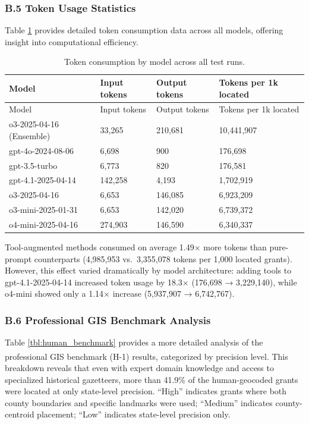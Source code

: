 \documentclass[
  10pt,
  twocolumn]{article}
\begin{document}
\subsubsection{B.5 Token Usage
Statistics}\label{b.5-token-usage-statistics}

Table \ref{tbl:token_usage} provides detailed token consumption data
across all models, offering insight into computational efficiency.

\begin{longtable}[]{@{}llll@{}}
\caption{\label{tbl:token_usage}Token consumption by model across all
test runs.}\tabularnewline
\toprule\noalign{}
Model & Input tokens & Output tokens & Tokens per 1k located \\
\midrule\noalign{}
\endfirsthead
\toprule\noalign{}
Model & Input tokens & Output tokens & Tokens per 1k located \\
\midrule\noalign{}
\endhead
\bottomrule\noalign{}
\endlastfoot
o3-2025-04-16 (Ensemble) & 33,265 & 210,681 & 10,441,907 \\
gpt-4o-2024-08-06 & 6,698 & 900 & 176,698 \\
gpt-3.5-turbo & 6,773 & 820 & 176,581 \\
gpt-4.1-2025-04-14 & 142,258 & 4,193 & 1,702,919 \\
o3-2025-04-16 & 6,653 & 146,085 & 6,923,209 \\
o3-mini-2025-01-31 & 6,653 & 142,020 & 6,739,372 \\
o4-mini-2025-04-16 & 274,903 & 146,590 & 6,340,337 \\
\end{longtable}

Tool-augmented methods consumed on average 1.49× more tokens than
pure-prompt counterparts (4,985,953 vs.~3,355,078 tokens per 1,000
located grants). However, this effect varied dramatically by model
architecture: adding tools to gpt-4.1-2025-04-14 increased token usage
by 18.3× (176,698 → 3,229,140), while o4-mini showed only a 1.14×
increase (5,937,907 → 6,742,767).

\subsubsection{B.6 Professional GIS Benchmark
Analysis}\label{b.6-professional-gis-benchmark-analysis}

Table \ref{tbl:human_benchmark} provides a more detailed analysis of the
professional GIS benchmark
(H-1)\textsuperscript{} results,
categorized by precision level. This breakdown reveals that even with
expert domain knowledge and access to specialized historical gazetteers,
more than 41.9\% of the human-geocoded grants were located at only
state-level precision. ``High'' indicates grants where both county
boundaries and specific landmarks were used; ``Medium'' indicates
county-centroid placement; ``Low'' indicates state-level precision only.
\end{document}
